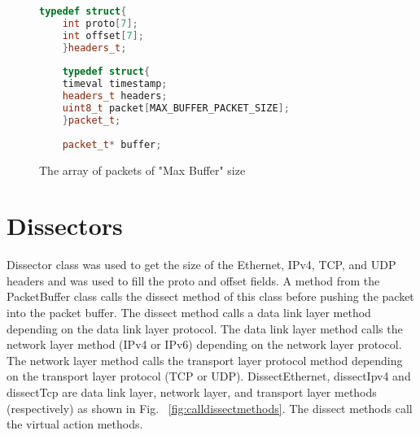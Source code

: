 \begin{figure}[H]
	\centering
	\begin{lstlisting}[frame=none,language=C++] 
	typedef struct{
	int proto[7];
	int offset[7];        
	}headers_t;
	
	typedef struct{
	timeval timestamp;
	headers_t headers;
	uint8_t packet[MAX_BUFFER_PACKET_SIZE];
	}packet_t;
	
	packet_t* buffer;
	\end{lstlisting}
	\caption[The array of packets of "Max Buffer" size]{The array of packets of "Max Buffer" size \cite{bib3}}
	\label{fig:packetbuffer}
\end{figure}
\squeezeup
\section{Dissectors}
Dissector class was used to get the size of the Ethernet, IPv4, TCP, and UDP headers and was used to fill the proto and offset fields. A method from the PacketBuffer class calls the dissect method of this class before pushing the packet into the packet buffer. The dissect method calls a data link layer method depending on the data link layer protocol. The data link layer method calls the network layer method (IPv4 or IPv6) depending on the network layer protocol. The network layer method calls the transport layer protocol method depending on the transport layer protocol (TCP or UDP). DissectEthernet, dissectIpv4 and dissectTcp are data link layer, network layer, and transport layer methods (respectively) as shown in Fig. ~\ref{fig:calldissectmethods}. The dissect methods call the virtual action methods.

